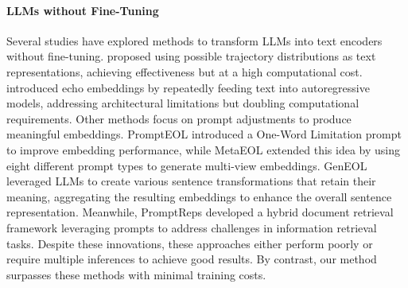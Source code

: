 \paragraph{LLMs without Fine-Tuning}
Several studies have explored methods to transform LLMs into text encoders without fine-tuning. \cite{DBLP:conf/iclr/LiuTAPZS24} proposed using possible trajectory distributions as text representations, achieving effectiveness but at a high computational cost. \citep{DBLP:journals/corr/abs-2402-15449} introduced echo embeddings by repeatedly feeding text into autoregressive models, addressing architectural limitations but doubling computational requirements. Other methods focus on prompt adjustments to produce meaningful embeddings. PromptEOL \citep{DBLP:conf/emnlp/JiangHLWZ24} introduced a One-Word Limitation prompt to improve embedding performance, while MetaEOL \citep{DBLP:conf/acl/LeiW00CTY24} extended this idea by using eight different prompt types to generate multi-view embeddings. GenEOL \citep{DBLP:journals/corr/abs-2410-14635} leveraged LLMs to create various sentence transformations that retain their meaning, aggregating the resulting embeddings to enhance the overall sentence representation. Meanwhile, PromptReps \cite{DBLP:conf/emnlp/ZhuangMKLZ24} developed a hybrid document retrieval framework leveraging prompts to address challenges in information retrieval tasks. Despite these innovations, these approaches either perform poorly or require multiple inferences to achieve good results. By contrast, our method surpasses these methods with minimal training costs.